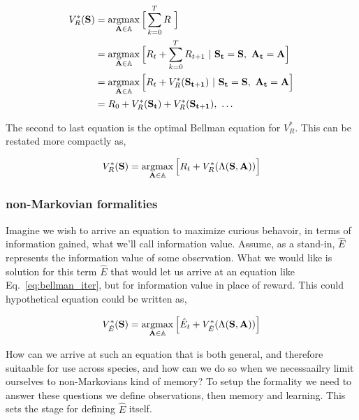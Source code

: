 \begin{equation} 
	\label{eq:bellman_seq}
    \begin{split}
        V^*_{R}(\mathbf{S}) &= \argmax_{\mathbf{A} \in \mathbb{A}} \Big [\sum_{k=0}^{T}  R \ \Big ]\\
                         	&= \argmax_{\mathbf{A} \in \mathbb{A}} \Big [ R_{t} + \sum_{k=0}^{T} R_{t+1} \ | \ \mathbf{S_t} = \mathbf{S},\ \mathbf{A_t} = \mathbf{A} \Big ]\\
							&= \argmax_{\mathbf{A} \in \mathbb{A}} \Big [ R_{t} + V^*_{R}(\mathbf{S_{t+1}}) \ | \ \mathbf{S_t} = \mathbf{S},\ \mathbf{A_t} = \mathbf{A} \Big ]\\
                         	&= R_0 + V^*_{R}(\mathbf{S_{t}}) + V^*_{R}(\mathbf{S_{t+1}}),\ \ldots
    \end{split}
\end{equation}

The second to last equation is the optimal Bellman equation for $V^*_R$. This can be restated more compactly as,

\begin{equation} 
\label{eq:bellman_iter}
V^*_R(\mathbf{S}) = \operatorname*{argmax}_{\mathbf{A} \in \mathbb{A}} \Big [ R_{t}  + V^*_{R}(\Lambda(\mathbf{S},\mathbf{A})) \Big ]
\end{equation}

\subsubsection*{non-Markovian formalities}
Imagine we wish to arrive an equation to maximize curious behavoir, in terms of information gained, what we'll call information value. Assume, as a stand-in, $\hat E$ represents the information value of some observation. What we would like is solution for this term $\hat E$ that would let us arrive at an equation like Eq.~\ref{eq:bellman_iter}, but for information value in place of reward. This could hypothetical equation could be written as, 

\begin{equation} 
	\label{eq:bellman_iter_E}
	V^*_{\hat E}(\mathbf{S}) = \operatorname*{argmax}_{\mathbf{A} \in \mathbb{A}} \Big [ \hat E_{t}  + V^*_{\hat E}(\Lambda(\mathbf{S},\mathbf{A})) \Big ]
\end{equation}

How can we arrive at such an equation that is both general, and therefore suitaable for use across species, and how can we do so when we necessaailry limit ourselves to non-Markovians kind of memory? To setup the formality we need to answer these questions we define observations, then memory and learning. This sets the stage for defining $\hat E$ itself.

